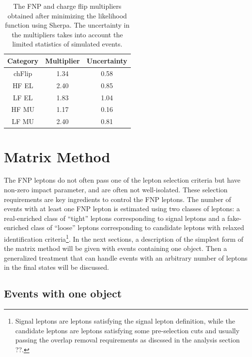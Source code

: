 \begin{table}[!htb]
  \caption{The FNP and charge flip multipliers obtained after minimizing the likelihood function using Sherpa.
    The uncertainty in the multipliers takes into account the limited statistics of simulated events.
    \label{t:fake_factors_sherpa}}
  \centering
  \begin{tabular}{|c|c|c|}
    \hline
    Category & Multiplier & Uncertainty  \\
    \hline
    chFlip & 1.34 & 0.58 \\ 
    HF EL & 2.40 & 0.85 \\
    LF EL & 1.83 & 1.04 \\
    HF MU & 1.17 & 0.16 \\
    LF MU & 2.40 & 0.81 \\
    \hline
  \end{tabular}                                                                                         
\end{table}



\section{Matrix Method}


The FNP leptons do not often pass one of the 
lepton selection criteria but have non-zero impact parameter, and are often not 
well-isolated. These selection requirements are key ingredients to control the FNP leptons. 
The number of events with at least one FNP lepton is estimated using two classes of leptons: 
a real-enriched class of ``tight'' leptons corresponding to signal leptons and a fake-enriched class of ``loose'' leptons 
corresponding to candidate leptons with relaxed identification criteria\footnote{Signal leptons are leptons satisfying the signal lepton definition, while the candidate leptons are leptons satisfying some pre-selection cuts and usually passing the overlap removal requirements as discssed in the analysis section ??.}. 
In the next sections, a description of the simplest form of the matrix method will be given with events containing one object. 
Then a generalized treatment that can handle events with an arbitrary number of leptons in the final states will be discussed.

\subsection{Events with one object}


